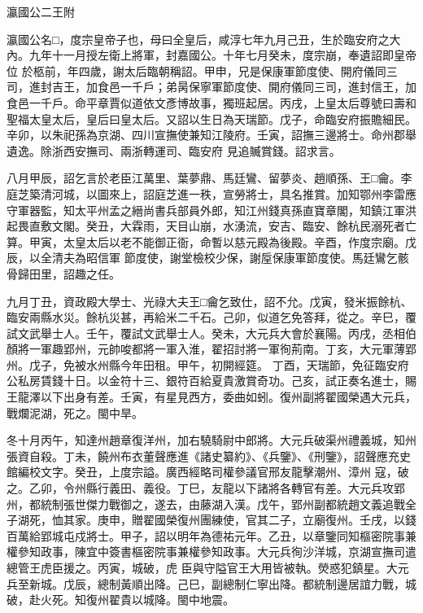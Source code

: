 
\begin{pinyinscope}

 瀛國公二王附



 瀛國公名□，度宗皇帝子也，母曰全皇后，咸淳七年九月己丑，生於臨安府之大內。九年十一月授左衛上將軍，封嘉國公。十年七月癸未，度宗崩，奉遺詔即皇帝位
 於柩前，年四歲，謝太后臨朝稱詔。甲申，兄是保康軍節度使、開府儀同三司，進封吉王，加食邑一千戶；弟昺保寧軍節度使、開府儀同三司，進封信王，加食邑一千戶。命平章賈似道依文彥博故事，獨班起居。丙戌，上皇太后尊號曰壽和聖福太皇太后，皇后曰皇太后。又詔以生日為天瑞節。戊子，命臨安府振贍細民。辛卯，以朱祀孫為京湖、四川宣撫使兼知江陵府。壬寅，詔撫三邊將士。命州郡舉遺逸。除浙西安撫司、兩浙轉運司、臨安府
 見追贓賞錢。詔求言。



 八月甲辰，詔乞言於老臣江萬里、葉夢鼎、馬廷鸞、留夢炎、趙順孫、王□龠。李庭芝築清河城，以圖來上，詔庭芝進一秩，宣勞將士，具名推賞。加知鄂州李雷應守軍器監，知太平州孟之縉尚書兵部員外郎，知江州錢真孫直寶章閣，知鎮江軍洪起畏直敷文閣。癸丑，大霖雨，天目山崩，水湧流，安吉、臨安、餘杭民溺死者亡算。甲寅，太皇太后以老不能御正衙，命暫以慈元殿為後殿。辛酉，作度宗廟。戊辰，以全清夫為昭信軍
 節度使，謝堂檢校少保，謝垕保康軍節度使。馬廷鸞乞骸骨歸田里，詔趣之任。



 九月丁丑，資政殿大學士、光祿大夫王□龠乞致仕，詔不允。戊寅，發米振餘杭、臨安兩縣水災。餘杭災甚，再給米二千石。己卯，似道乞免答拜，從之。辛巳，覆試文武舉士人。壬午，覆試文武舉士人。癸未，大元兵大會於襄陽。丙戌，丞相伯顏將一軍趣郢州，元帥唆都將一軍入淮，翟招討將一軍徇荊南。丁亥，大元軍薄郢州。戊子，免被水州縣今年田租。甲午，初開經筵。
 丁酉，天瑞節，免征臨安府公私房賃錢十日。以金符十三、銀符百給夏貴激賞奇功。己亥，試正奏名進士，賜王龍澤以下出身有差。壬寅，有星見西方，委曲如蚓。復州副將翟國榮遇大元兵，戰爛泥湖，死之。閩中旱。



 冬十月丙午，知達州趙章復洋州，加右驍騎尉中郎將。大元兵破渠州禮義城，知州張資自殺。丁未，饒州布衣董聲應進《諸史纂約》、《兵鑒》、《刑鑒》，詔聲應充史館編校文字。癸丑，上度宗謚。廣西經略司權參議官邢友龍擊潮州、漳州
 寇，破之。乙卯，令州縣行義田、義役。丁巳，友龍以下諸將各轉官有差。大元兵攻郢州，都統制張世傑力戰御之，遂去，由藤湖入漢。戊午，郢州副都統趙文義追戰全子湖死，恤其家。庚申，贈翟國榮復州團練使，官其二子，立廟復州。壬戌，以錢百萬給郢城屯戍將士。甲子，詔以明年為德祐元年。乙丑，以章鑒同知樞密院事兼權參知政事，陳宜中簽書樞密院事兼權參知政事。大元兵徇沙洋城，京湖宣撫司遣總管王虎臣援之。丙寅，城破，虎
 臣與守隘官王大用皆被執。熒惑犯鎮星。大元兵至新城。戊辰，總制黃順出降。己巳，副總制仁寧出降。都統制邊居誼力戰，城破，赴火死。知復州翟貴以城降。閩中地震。




\end{pinyinscope}
